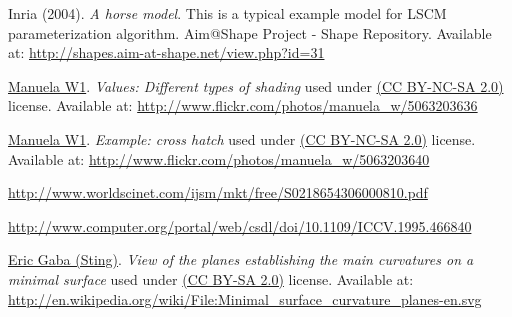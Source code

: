 \begin{thebibliography}{9}

  Inria (2004). \emph{A horse model}. This is a typical example model for LSCM
  parameterization algorithm.  Aim@Shape Project - Shape Repository.
  Available at:
  \url{http://shapes.aim-at-shape.net/view.php?id=31}

  \href{http://www.flickr.com/photos/manuela_w/}{Manuela W1}.  \emph{Values:
  Different types of shading} used under
  \href{http://creativecommons.org/licenses/by-nc-sa/2.0/}{(CC BY-NC-SA 2.0)}
  license.  Available at:
  \url{http://www.flickr.com/photos/manuela_w/5063203636}

  \href{http://www.flickr.com/photos/manuela_w/}{Manuela W1}.  \emph{Example:
  cross hatch} used under
  \href{http://creativecommons.org/licenses/by-nc-sa/2.0/}{(CC BY-NC-SA 2.0)}
  license.  Available at:
  \url{http://www.flickr.com/photos/manuela_w/5063203640}

  \url{http://www.worldscinet.com/ijsm/mkt/free/S0218654306000810.pdf}

  \url{http://www.computer.org/portal/web/csdl/doi/10.1109/ICCV.1995.466840}

  \href{http://commons.wikimedia.org/wiki/User:Sting}{Eric Gaba (Sting)}.
  \emph{View of the planes establishing the main curvatures on a minimal
  surface} used under \href{http://creativecommons.org/licenses/by-sa/2.0/}{(CC
  BY-SA 2.0)} license.  Available at:
  \url{http://en.wikipedia.org/wiki/File:Minimal_surface_curvature_planes-en.svg}

\end{thebibliography}
